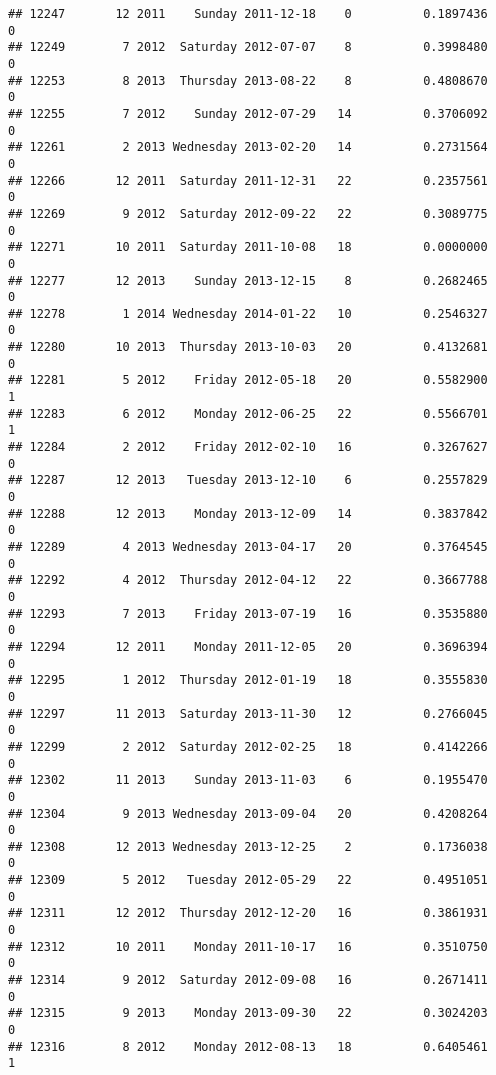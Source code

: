 \documentclass[
]{article}
\begin{document}
\begin{verbatim}
## 12247       12 2011    Sunday 2011-12-18    0          0.1897436             0
## 12249        7 2012  Saturday 2012-07-07    8          0.3998480             0
## 12253        8 2013  Thursday 2013-08-22    8          0.4808670             0
## 12255        7 2012    Sunday 2012-07-29   14          0.3706092             0
## 12261        2 2013 Wednesday 2013-02-20   14          0.2731564             0
## 12266       12 2011  Saturday 2011-12-31   22          0.2357561             0
## 12269        9 2012  Saturday 2012-09-22   22          0.3089775             0
## 12271       10 2011  Saturday 2011-10-08   18          0.0000000             0
## 12277       12 2013    Sunday 2013-12-15    8          0.2682465             0
## 12278        1 2014 Wednesday 2014-01-22   10          0.2546327             0
## 12280       10 2013  Thursday 2013-10-03   20          0.4132681             0
## 12281        5 2012    Friday 2012-05-18   20          0.5582900             1
## 12283        6 2012    Monday 2012-06-25   22          0.5566701             1
## 12284        2 2012    Friday 2012-02-10   16          0.3267627             0
## 12287       12 2013   Tuesday 2013-12-10    6          0.2557829             0
## 12288       12 2013    Monday 2013-12-09   14          0.3837842             0
## 12289        4 2013 Wednesday 2013-04-17   20          0.3764545             0
## 12292        4 2012  Thursday 2012-04-12   22          0.3667788             0
## 12293        7 2013    Friday 2013-07-19   16          0.3535880             0
## 12294       12 2011    Monday 2011-12-05   20          0.3696394             0
## 12295        1 2012  Thursday 2012-01-19   18          0.3555830             0
## 12297       11 2013  Saturday 2013-11-30   12          0.2766045             0
## 12299        2 2012  Saturday 2012-02-25   18          0.4142266             0
## 12302       11 2013    Sunday 2013-11-03    6          0.1955470             0
## 12304        9 2013 Wednesday 2013-09-04   20          0.4208264             0
## 12308       12 2013 Wednesday 2013-12-25    2          0.1736038             0
## 12309        5 2012   Tuesday 2012-05-29   22          0.4951051             0
## 12311       12 2012  Thursday 2012-12-20   16          0.3861931             0
## 12312       10 2011    Monday 2011-10-17   16          0.3510750             0
## 12314        9 2012  Saturday 2012-09-08   16          0.2671411             0
## 12315        9 2013    Monday 2013-09-30   22          0.3024203             0
## 12316        8 2012    Monday 2012-08-13   18          0.6405461             1

\end{verbatim}
\end{document}
